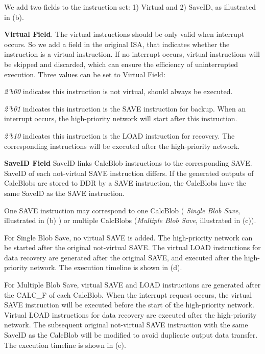 We add two fields to the instruction set: 1) Virtual and 2) SaveID, as illustrated in (b). 

\textbf{   Virtual Field}. The virtual instructions should be only valid when interrupt occurs. So we add a field in the original ISA, that indicates whether the instruction is a virtual instruction. If no interrupt occurs, virtual instructions will be skipped and discarded, which can ensure the efficiency of uninterrupted execution. Three values can be set to Virtual Field:

	\textit{2'b00} indicates this instruction is not virtual, should always be executed.
	
	\textit{2'b01} indicates this instruction is the SAVE instruction for backup. When an interrupt occurs, the high-priority network will start after this instruction.
	
	\textit{2'b10} indicates this instruction is the LOAD instruction for recovery. The corresponding instructions will be executed after the high-priority network.

\textbf{ SaveID Field }
SaveID links CalcBlob instructions to the corresponding SAVE. SaveID of each not-virtual SAVE instruction differs. If the generated outputs of CalcBlobs are stored to DDR by a SAVE instruction, the CalcBlobs have the same SaveID as the SAVE instruction.

One SAVE instruction may correspond to one CalcBlob ( \textit{Single Blob Save}, illustrated in (b) ) or multiple CalcBlobs (\textit{Multiple Blob Save}, illustrated in (c)).

For Single Blob Save, no virtual SAVE is added. The high-priority network can be started after the original not-virtual SAVE. The virtual LOAD instructions for data recovery are generated after the original SAVE, and executed after the high-priority network. The execution timeline is shown in (d).

For Multiple Blob Save, virtual SAVE and LOAD instructions are generated after the CALC\_F of each CalcBlob. When the interrupt request occurs, the virtual SAVE instruction will be executed before the start of the high-priority network. Virtual LOAD instructions for data recovery are executed after the high-priority network. The subsequent original not-virtual SAVE instruction with the same SaveID as the CalcBlob will be modified to avoid duplicate output data transfer. The execution timeline is shown in (e).



